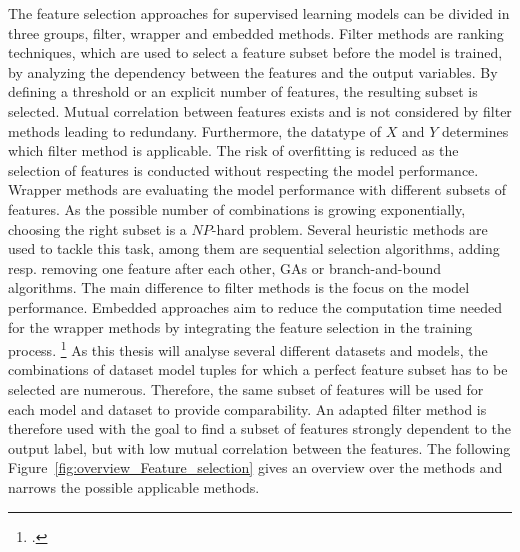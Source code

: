 The feature selection approaches for supervised learning models can be divided in three groups, filter, wrapper and embedded methods.
Filter methods are ranking techniques, which are used to select a feature subset before the model is trained, by analyzing
the dependency between the features and the output variables. By defining a threshold or an explicit number of features, the
resulting subset is selected. Mutual correlation between features exists and is not considered by filter methods
leading to redundany. Furthermore, the datatype of $X$ and $Y$ determines which filter method is applicable. The risk
of overfitting is reduced as the selection of features is conducted without respecting the model performance.
Wrapper methods are evaluating the model performance with different subsets of features. As the possible number of combinations is growing
exponentially, choosing the right subset is a $NP$-hard problem. Several heuristic methods are used to tackle this task, among them
are sequential selection algorithms, adding resp. removing one feature after each other,
\glspl{GA} or branch-and-bound algorithms. The main difference to filter methods is the focus on the model performance.
Embedded approaches aim to reduce the computation time needed for the wrapper methods by integrating the
feature selection in the training process. \footcites[cf.][pp.17-21]{chandrashekar_survey_2014} As this thesis will analyse several
different datasets and models, the combinations of dataset model tuples for which a perfect feature subset
has to be selected are numerous. Therefore, the same subset of features will be used for each model and dataset to provide comparability.
An adapted filter method is therefore used with the goal to find a subset of features strongly dependent
to the output label, but with low mutual correlation between the features. The following Figure~\ref{fig:overview_Feature_selection}
gives an overview over the methods and narrows the possible applicable methods.




